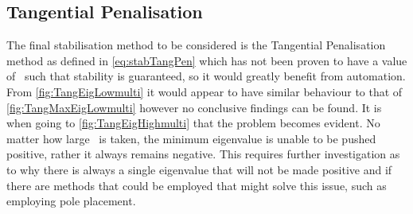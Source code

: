 \subsection{Tangential Penalisation}

The final stabilisation method to be considered is the Tangential Penalisation method as defined in \autoref{eq:stabTangPen} which has not been proven to have a value of \mgamma~such that stability is guaranteed, so it would greatly benefit from automation. From \autoref{fig:TangEigLowmulti} it would appear to have similar behaviour to that of \autoref{fig:TangMaxEigLowmulti} however no conclusive findings can be found. It is when going to \autoref{fig:TangEigHighmulti} that the problem becomes evident. No matter how large \mgamma~is taken, the minimum eigenvalue is unable to be pushed positive, rather it always remains negative. This requires further investigation as to why there is always a single eigenvalue that will not be made positive and if there are methods that could be employed that might solve this issue, such as employing pole placement.
